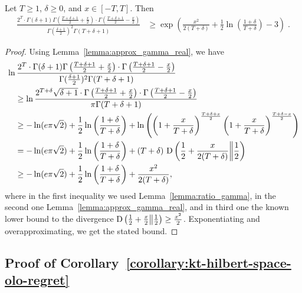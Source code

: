 \begin{lemma}
\label{lemma:lower_bound_gamma}
Let $T \ge 1$, $\delta \ge 0$, and $x \in [-T,T]$. Then
\begin{align*}
\frac{2^T \cdot \Gamma(\delta+1) \Gamma \left(\frac{T+\delta+1}{2} + \frac{x}{2} \right) \cdot \Gamma \left(\frac{T+\delta+1}{2} - \frac{x}{2} \right)}{ \Gamma(\frac{\delta+1}{2})^2 \Gamma(T+\delta+1)}
&\geq\exp\left(\frac{x^2}{2(T+\delta)} +\frac{1}{2} \ln \left(\frac{1+\delta}{T+\delta}\right) - 3\right) \;.
\end{align*}
\end{lemma}
\begin{proof}
Using Lemma~\ref{lemma:approx_gamma_real}, we have
\begin{align*}
&\ln \frac{2^T \cdot \Gamma(\delta+1) \Gamma \left(\frac{T+\delta+1}{2} + \frac{x}{2} \right) \cdot \Gamma \left(\frac{T+\delta+1}{2} - \frac{x}{2} \right)}{ \Gamma(\frac{\delta+1}{2})^2 \Gamma(T+\delta+1)} \\
&\quad \geq \ln \frac{2^{T+\delta} \sqrt{\delta+1} \cdot \Gamma \left(\frac{T+\delta+1}{2} + \frac{x}{2} \right) \cdot \Gamma \left(\frac{T+\delta+1}{2} - \frac{x}{2} \right)}{ \pi \Gamma(T+\delta+1)} \\
&\quad \geq -\ln(e \pi \sqrt{2}) +\frac{1}{2} \ln\left(\frac{1+\delta}{T+\delta}\right) +\ln \left(\left( 1+\frac{x}{T+\delta} \right)^\frac{T+\delta+x}{2} \left( 1+\frac{x}{T+\delta} \right)^\frac{T+\delta-x}{2}\right) \\
&\quad = -\ln(e \pi \sqrt{2}) +\frac{1}{2} \ln\left(\frac{1+\delta}{T+\delta}\right)+ (T+\delta) \, \operatorname*{D}\left({\frac{1}{2}+\frac{x}{2(T+\delta)}}\middle\|{\frac{1}{2}}\right) \\
&\quad \geq -\ln(e \pi \sqrt{2}) +\frac{1}{2} \ln\left(\frac{1+\delta}{T+\delta}\right)+ \frac{x^2}{2(T+\delta)} ,
\end{align*}
where in the first inequality we used Lemma~\ref{lemma:ratio_gamma}, in the second one Lemma~\ref{lemma:approx_gamma_real}, and in third one the known lower bound to the divergence $\operatorname*{D}\left({\frac{1}{2}+\frac{x}{2}}\middle\|{\frac{1}{2}}\right) \geq \frac{x^2}{2}$. Exponentiating and overapproximating, we get the stated bound.
\end{proof}


\subsection{Proof of Corollary~\ref{corollary:kt-hilbert-space-olo-regret}}

